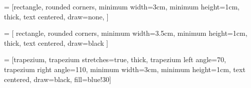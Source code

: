 \newcommand{\mkTrellisInsert}[1]{
  \begin{tikzpicture}
  \setcounter{i}{0}
  \setcounter{z}{0}
  \setcounter{xn}{0}
  \setcounter{xnn}{0}
  \stepcounter{i}
  \node[circle, draw] (\arabic{i}) at (0,0){};
  \foreach [count=\i] \x in {2,...,#1}{
    \pgfmathsetmacro{\lox}{\x-1}%
    \pgfmathsetmacro{\loxt}{\x-3}%
    \foreach [count=\j] \xx in {-\lox,-\loxt,...,\lox}{
      \pgfmathsetmacro{\jj}{\j-1}%
      \stepcounter{i}
      \pgfmathsetmacro{\mp}{\xx+#1}%
      \pgfmathsetmacro{\mq}{\xx+\x}%
      \pgfmathsetmacro{\lbl}{\lox!/(\jj!*(\lox-\jj)!)}
      \ifnum\x>\mp
      \pgfmath\node[circle, draw, fill=black!30]  (\arabic{i}) at (\xx*\dx, -\lox*\dy) {};
      \else
        \ifnum#1<\mq
        \pgfmath\node[circle, draw, fill=black!30]  (\arabic{i}) at (\xx*\dx, -\lox*\dy) {};
        \else
          \pgfmath\node[circle, draw]  (\arabic{i}) at (\xx*\dx, -\lox*\dy) {};
        \fi
      \fi

    }
  }
  \pgfmathsetmacro{\maxx}{#1 - 1}
  \foreach \x in {1,...,\maxx}{
    \foreach \xx in {1,...,\x}{
      \stepcounter{z}
      \setcounter{xn}{\arabic{z}}
      \addtocounter{xn}{\x}
      \setcounter{xnn}{\arabic{xn}}
      \stepcounter{xnn}
      \draw [<-] (\arabic{z}) -- (\arabic{xn});
      \draw [<-] (\arabic{z}) -- (\arabic{xnn});
    }
  }
  \end{tikzpicture}
}

\usetikzlibrary{automata, positioning, arrows}

\newcommand{\nobarfrac}{\genfrac{}{}{0pt}{}}
\loctimings
{}\unloctimings
{}\naturalerrors
{}\syntheticerrors

\usepackage[all,pdf]{xy}

\newcommand{\bs}{\blacksquare}
\newcommand{\ws}{\square}

\usepackage{multicol}
\usetikzlibrary{shapes.geometric, arrows}

 = [rectangle, rounded corners,
minimum width=3cm,
minimum height=1cm,
thick,
text centered,
draw=none,
]

 = [
rectangle,
rounded corners,
minimum width=3.5cm,
minimum height=1cm,
thick,
text centered,
draw=black
]

 = [trapezium,
trapezium stretches=true, %
thick,
trapezium left angle=70,
trapezium right angle=110,
minimum width=3cm,
minimum height=1cm, text centered,
draw=black, fill=blue!30]

